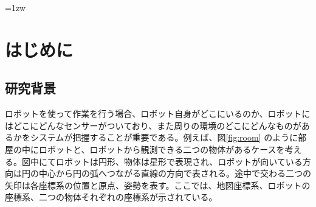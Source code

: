 \documentclass[a4paper]{jreport}	%
\begin{document}
\makecover

\addtolength{\textheight}{-5mm}	%
\setlength{\footskip}{15mm}	%
\fontsize{11pt}{15pt}\selectfont

\pagebreak\setcounter{page}{1}
\pagestyle{plain}
\tableofcontents
\listoffigures

\parindent=1zw	%
\pagebreak\setcounter{page}{1}
\pagestyle{plain}




\chapter{はじめに}
\section{研究背景}


ロボットを使って作業を行う場合、ロボット自身がどこにいるのか、ロボットにはどこにどんなセンサーがついており、また周りの環境のどこにどんなものがあるかをシステムが把握することが重要である。例えば、図\ref{fig:room} のように部屋の中にロボットと、ロボットから観測できる二つの物体があるケースを考える。図中にてロボットは円形、物体は星形で表現され、ロボットが向いている方向は円の中心から円の弧へつながる直線の方向で表される。途中で交わる二つの矢印は各座標系の位置と原点、姿勢を表す。ここでは、地図座標系、ロボットの座標系、二つの物体それぞれの座標系が示されている。
\end{document}
